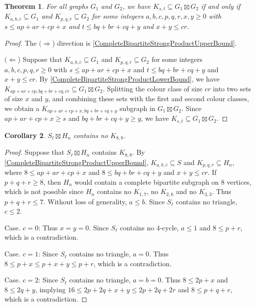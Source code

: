 \documentclass[a4paper,11pt]{article}
\theoremstyle{plain}
\newtheorem{thm}{Theorem}
\newtheorem{cor}[thm]{Corollary}
\theoremstyle{definition}
\renewcommand{\leq}{\leqslant}
\renewcommand{\geq}{\geqslant}
\begin{document}
\begin{thm}
	For all graphs $G_1$ and $G_2$, we have $K_{s,t} \subseteq G_1\boxtimes G_2$ if and only if 
	$K_{a,b,\overline{c}}\subseteq G_1$ and $K_{p,q,\overline{r}}\subseteq G_2$ for some integers $a,b,c,p,q,r,x,y\geq 0$ with $s\leq ap+ar+cp+x$ and $t\leq bq+br+cq+y$ and $x+y\leq cr$. 
\end{thm}

\begin{proof}
The $(\Longrightarrow$) direction is 
\cref{CompleteBipartiteStrongProductUpperBound}.

	$(\Longleftarrow$) Suppose that $K_{a,b,\overline{c}}\subseteq G_1$ and $K_{p,q,\overline{r}}\subseteq G_2$ for some integers $a,b,c,p,q,r\geq 0$ with $s\leq ap+ar+cp+x$ and $t\leq bq+br+cq+y$ and $x+y\leq cr$. 	By \cref{CompleteBipartiteStrongProductLowerBound}, we have 
	$K_{ap+ar+cp, bq+br+cq,\overline{cr}} \subseteq  G_1\boxtimes G_2$. 
	Splitting the colour class of size $cr$ into two sets of size $x$ and $y$, and combining these sets with the first and second colour classes, we obtain a
	$K_{ap+ar+cp+x, bq+br+cq+y}$ subgraph in $G_1\boxtimes G_2$. 
Since $ap+ar+cp+x\geq s$ and $bq+br+cq+y\geq y$, we have 
	 $K_{s,t} \subseteq G_1\boxtimes G_2$.
\end{proof}


\begin{cor}
	$S_\ell \boxtimes H_n$ contains no $K_{8,8}$.
\end{cor}

\begin{proof}
	Suppose that $S_\ell \boxtimes H_n$ contains $K_{8,8}$. 
	By \cref{CompleteBipartiteStrongProductUpperBound}, 
	$K_{a,b,\overline{c}}\subseteq S$ and $K_{p,q,\overline{r}}\subseteq H_n$, 
	where  $8\leq ap+ar +cp +x$ and $8\leq bq+br+cq+y$ and $x+y\leq cr$. 
	If $p+q+r\geq 8$, then $H_n$ would contain a complete bipartite subgraph on 8 vertices, which is not possible since  $H_n$ contains no $K_{1,7}$, no $K_{2,6}$ and no $K_{3,3}$. Thus $p+q+r\leq 7$. 	
	Without loss of generality, $a\leq b$. Since $S_\ell$ contains no triangle, $c\leq 2$. 
	
	Case. $c=0$: Thus $x=y=0$. 
	Since $S_\ell$ contains no 4-cycle, $a\leq 1$ and $8\leq p+r$, which is a contradiction.  
	
	Case. $c=1$: 
	Since $S_\ell$ contains no triangle, $a=0$. 
	Thus $8\leq p +x \leq p+x+y\leq p+r$, which is a contradiction. 
	
	Case. $c=2$: 
	Since $S_\ell$ contains no triangle, $a=b=0$. 
	Thus $8\leq 2p +x$ and $8\leq 2q+y$, implying
	$16\leq 2p + 2q +x+y \leq 2p+2q + 2r$ and $8\leq p+q+r$, which is a contradiction. 
\end{proof}
\end{document}
